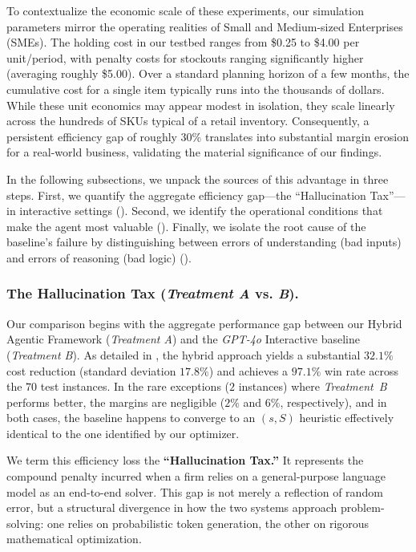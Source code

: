 \documentclass[mnsc,nonblindrev]{informs3_hide}
\begin{document}
To contextualize the economic scale of these experiments, our simulation parameters mirror the operating realities of Small and Medium-sized Enterprises (SMEs). The holding cost in our testbed ranges from \$0.25 to \$4.00 per unit/period, with penalty costs for stockouts ranging significantly higher (averaging roughly \$5.00). Over a standard planning horizon of a few months, the cumulative cost for a single item typically runs into the thousands of dollars. While these unit economics may appear modest in isolation, they scale linearly across the hundreds of SKUs typical of a retail inventory. Consequently, a persistent efficiency gap of roughly 30\% translates into substantial margin erosion for a real-world business, validating the material significance of our findings.



{In the following subsections, we unpack the sources of this advantage in three steps. First, we quantify the aggregate efficiency gap—the ``Hallucination Tax''—in interactive settings (). Second, we identify the operational conditions that make the agent most valuable (). Finally, we isolate the root cause of the baseline's failure by distinguishing between errors of understanding (bad inputs) and errors of reasoning (bad logic) ().}



\subsubsection{The Hallucination Tax (\emph{Treatment A} vs. \emph{B}).}
\label{sec:hallucination_tax}



Our comparison begins with the aggregate performance gap between our Hybrid Agentic Framework (\emph{Treatment A}) and the \emph{GPT-4o} Interactive baseline (\emph{Treatment B}). As detailed in , the hybrid approach yields a substantial $\mathbf{32.1\%}$ cost reduction (standard deviation $17.8\%$) and achieves a $97.1\%$ win rate across the $70$ test instances. In the rare exceptions ($2$ instances) where \emph{Treatment~B} performs better, the margins are negligible ($2\%$ and $6\%$, respectively), and in both cases, the baseline happens to converge to an $(s, S)$ heuristic effectively identical to the one identified by our optimizer.

We term this efficiency loss the \textbf{``Hallucination Tax.''} It represents the compound penalty incurred when a firm relies on a general-purpose language model as an end-to-end solver. This gap is not merely a reflection of random error, but a structural divergence in how the two systems approach problem-solving: one relies on probabilistic token generation, the other on rigorous mathematical optimization.
\end{document}

